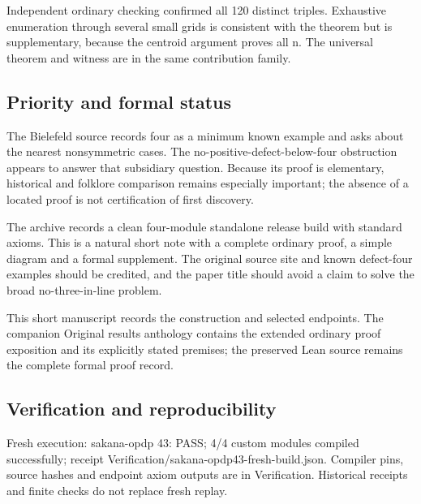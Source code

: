 \documentclass[11pt,a4paper]{article}
\begin{document}
Independent ordinary checking confirmed all 120 distinct triples. Exhaustive enumeration through several small grids is consistent with the theorem but is supplementary, because the centroid argument proves all n. The universal theorem and witness are in the same contribution family.

\subsection{Priority and formal status}
The Bielefeld source records four as a minimum known example and asks about the nearest nonsymmetric cases. The no-positive-defect-below-four obstruction appears to answer that subsidiary question. Because its proof is elementary, historical and folklore comparison remains especially important; the absence of a located proof is not certification of first discovery.

The archive records a clean four-module standalone release build with standard axioms. This is a natural short note with a complete ordinary proof, a simple diagram and a formal supplement. The original source site and known defect-four examples should be credited, and the paper title should avoid a claim to solve the broad no-three-in-line problem.

{\small This short manuscript records the construction and selected endpoints. The companion Original results anthology contains the extended ordinary proof exposition and its explicitly stated premises; the preserved Lean source remains the complete formal proof record.\par}

\subsection{Verification and reproducibility}
Fresh execution: sakana-opdp 43: PASS; 4/4 custom modules compiled successfully; receipt Verification/sakana-opdp43-fresh-build.json. Compiler pins, source hashes and endpoint axiom outputs are in Verification. Historical receipts and finite checks do not replace fresh replay.
\end{document}
